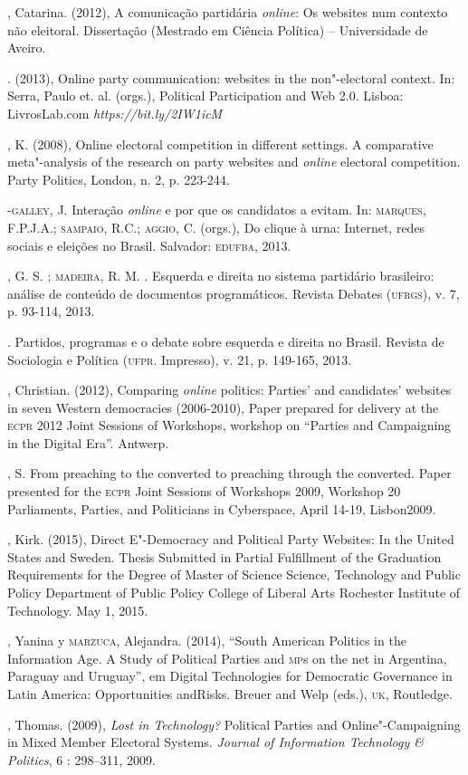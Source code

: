 \begin{bibliohedra}
, Catarina. (2012), A comunicação partidária \emph{\emph{online}}: Os websites
num contexto não eleitoral. Dissertação (Mestrado em Ciência Política)
-- Universidade de Aveiro.

\titidem. (2013), Online party communication: websites in the
non"-electoral context. In: Serra, Paulo et. al. (orgs.), Political
Participation and Web 2.0. Lisboa: LivrosLab.com
\emph{https://bit.ly/2IW1icM}

, K. (2008), Online electoral competition in different
settings. A comparative meta"-analysis of the research on party websites
and \emph{\emph{online}} electoral competition. Party Politics, London, n. 2, p.
223-244.

-\textsc{galley}, J. Interação \emph{\emph{online}} e por que os candidatos a evitam.
In: \textsc{marques}, F.P.J.A.; \textsc{sampaio}, R.C.; \textsc{aggio}, C. (orgs.), Do clique à
urna: Internet, redes sociais e eleições no Brasil. Salvador: \textsc{edufba},
2013.

, G. S. ; \textsc{madeira}, R. M. . Esquerda e direita no sistema
partidário brasileiro: análise de conteúdo de documentos programáticos.
Revista Debates (\textsc{ufrgs}), v. 7, p. 93-114, 2013.

\titidem. Partidos, programas e o debate sobre
esquerda e direita no Brasil. Revista de Sociologia e Política (\textsc{ufpr}.
Impresso), v. 21, p. 149-165, 2013.

, Christian. (2012), Comparing \emph{\emph{online}} politics: Parties' and
candidates' websites in seven Western democracies (2006-2010), Paper
prepared for delivery at the \textsc{ecpr} 2012 Joint Sessions of Workshops,
workshop on ``Parties and Campaigning in the Digital Era''. Antwerp.

, S. From preaching to the converted to preaching through the
converted. Paper presented for the \textsc{ecpr} Joint Sessions of Workshops
2009, Workshop 20 Parliaments, Parties, and Politicians in Cyberspace,
April 14-19, Lisbon2009.

, Kirk. (2015), Direct E"-Democracy and Political Party Websites:
In the United States and Sweden. Thesis Submitted in Partial Fulfillment
of the Graduation Requirements for the Degree of Master of Science
Science, Technology and Public Policy Department of Public Policy
College of Liberal Arts Rochester Institute of Technology. May 1, 2015.

, Yanina y \textsc{marzuca}, Alejandra. (2014), ``South American Politics in
the Information Age. A Study of Political Parties and \textsc{mp}s on the net in
Argentina, Paraguay and Uruguay'', em Digital Technologies for
Democratic Governance in Latin America: Opportunities andRisks. Breuer
and Welp (eds.), \textsc{uk}, Routledge.

, Thomas. (2009), \emph{Lost in Technology?} Political Parties and
Online"-Campaigning in Mixed Member Electoral Systems. \emph{Journal of
Information Technology \& Politics}, 6 : 298--311, 2009.
\end{bibliohedra}


